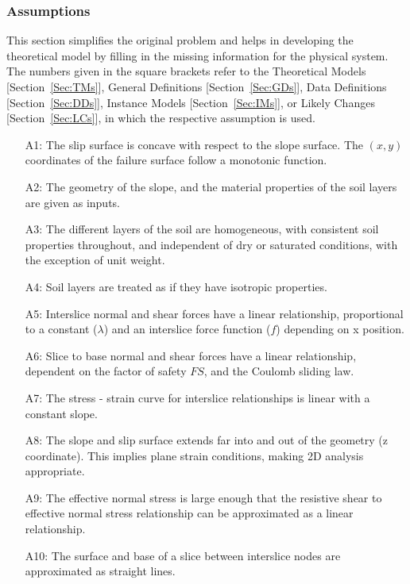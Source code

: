 \documentclass[12pt]{article}
\begin{document}
\subsubsection{Assumptions}
\label{Sec:Assumps}
This section simplifies the original problem and helps in developing the theoretical model by filling in the missing information for the physical system. The numbers given in the square brackets refer to the Theoretical Models {[}Section~\ref{Sec:TMs}{]}, General Definitions {[}Section~\ref{Sec:GDs}{]}, Data Definitions {[}Section~\ref{Sec:DDs}{]}, Instance Models {[}Section~\ref{Sec:IMs}{]}, or Likely Changes {[}Section~\ref{Sec:LCs}{]}, in which the respective assumption is used.
\begin{itemize}
\item[A1:]The slip surface is concave with respect to the slope surface. The $(x,y)$ coordinates of the failure surface follow a monotonic function.
\item[A2:]The geometry of the slope, and the material properties of the soil layers are given as inputs.
\item[A3:]The different layers of the soil are homogeneous, with consistent soil properties throughout, and independent of dry or saturated conditions, with the exception of unit weight.
\item[A4:]Soil layers are treated as if they have isotropic properties.
\item[A5:]Interslice normal and shear forces have a linear relationship, proportional to a constant ($\lambda{}$) and an interslice force function ($f$) depending on x position.
\item[A6:]Slice to base normal and shear forces have a linear relationship, dependent on the factor of safety $FS$, and the Coulomb sliding law.
\item[A7:]The stress - strain curve for interslice relationships is linear with a constant slope.
\item[A8:]The slope and slip surface extends far into and out of the geometry (z coordinate). This implies plane strain conditions, making 2D analysis appropriate.
\item[A9:]The effective normal stress is large enough that the resistive shear to effective normal stress relationship can be approximated as a linear relationship.
\item[A10:]The surface and base of a slice between interslice nodes are approximated as straight lines.
\end{itemize}
\end{document}
